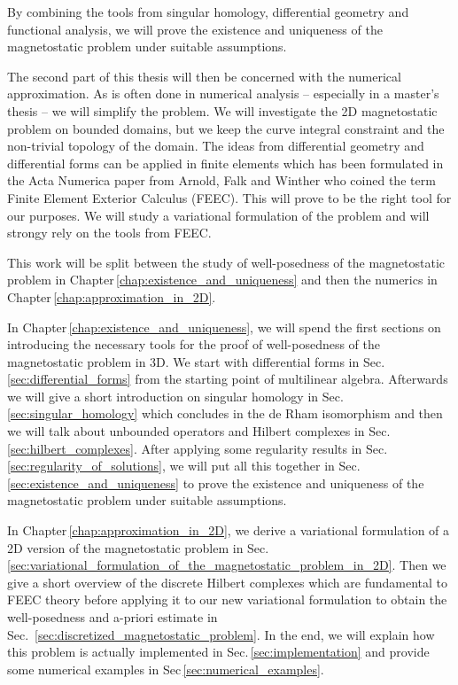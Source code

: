 \documentclass[../master_thesis.tex]{subfiles}
\begin{document}
By combining the tools from singular homology, differential geometry and 
functional analysis, we will prove the existence and uniqueness of the magnetostatic problem 
under suitable assumptions.

The second part of this thesis will then be concerned with the numerical approximation. 
As is often done in numerical analysis -- especially in a master's thesis -- we 
will simplify the problem. We will investigate the 2D magnetostatic problem on bounded domains, 
but we keep the curve integral 
constraint and the non-trivial topology of the domain. The ideas from differential geometry and 
differential forms can be applied in finite elements
which has been formulated in the Acta Numerica paper from Arnold, Falk and Winther 
\cite{arnold_falk_winther} who coined the term Finite Element Exterior Calculus (FEEC). This will prove to 
be the right tool for our purposes. We will study a variational formulation of the problem 
and will strongy rely on the tools from FEEC.


This work will be split between the study of well-posedness of the magnetostatic problem 
in Chapter\,\ref{chap:existence_and_uniqueness} and then the numerics in Chapter\,\ref{chap:approximation_in_2D}.

In Chapter\,\ref{chap:existence_and_uniqueness}, we will spend the first sections on 
introducing the necessary tools for the proof of well-posedness of the magnetostatic problem 
in 3D. We start with differential forms in Sec.\,\ref{sec:differential_forms} from the starting point 
of multilinear algebra. Afterwards we will give a short introduction on 
singular homology in Sec.\,\ref{sec:singular_homology} which concludes in the de Rham isomorphism and then 
we will talk about unbounded operators and Hilbert 
complexes in Sec.\,\ref{sec:hilbert_complexes}. After applying some regularity results in Sec.\,\ref{sec:regularity_of_solutions},
we will put all this together in Sec.\,\ref{sec:existence_and_uniqueness} to prove the existence and uniqueness 
of the magnetostatic problem under suitable assumptions.

In Chapter\,\ref{chap:approximation_in_2D}, we derive a variational formulation of a 2D version of the 
magnetostatic problem in Sec.\,\ref{sec:variational_formulation_of_the_magnetostatic_problem_in_2D}. Then we give a short overview of the discrete Hilbert complexes 
which are fundamental to FEEC theory before applying it to our new variational formulation 
to obtain the well-posedness and a-priori estimate in Sec.~\ref{sec:discretized_magnetostatic_problem}. 
In the end, we will explain how this 
problem is actually implemented in Sec.\,\ref{sec:implementation} 
and provide some numerical examples in Sec\,\ref{sec:numerical_examples}.
\end{document}
